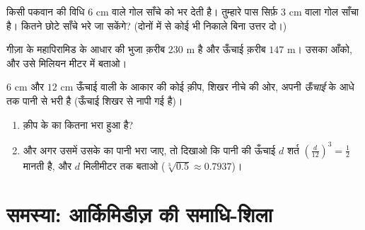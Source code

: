 \begin{exercise}[$\star\star$]\label{exo:g9:solids:7}
किसी पकवान की विधि $6$ cm  वाले गोल साँचे को भर देती है।
तुम्हारे पास सिर्फ़ $3$ cm  वाला गोल साँचा है। कितने छोटे
साँचे भरे जा सकेंगे? (दोनों में से कोई भी  निकाले बिना उत्तर
दो।)
\end{exercise}

\begin{exercise}[$\star\star$]\label{exo:g9:solids:8}
गीज़ा के महापिरामिड के आधार की भुजा क़रीब $230$ m है और ऊँचाई क़रीब
$147$ m। उसका  आँको, और उसे मिलियन  मीटर में बताओ।
\end{exercise}

\begin{exercise}[$\star\star\star$]\label{exo:g9:solids:9}
$6$ cm  और $12$ cm ऊँचाई वाली  के आकार की कोई क़ीप, शिखर
नीचे की ओर, अपनी \emph{ऊँचाई} के आधे तक पानी से भरी है (ऊँचाई शिखर
से नापी गई है)।
\begin{enumerate}
  \item क़ीप के  का कितना  भरा हुआ है?
  \item और अगर उसमें उसके \emph{} का  पानी भरा जाए, तो
        दिखाओ कि पानी की ऊँचाई $d$ शर्त
        $\left(\frac{d}{12}\right)^3 = \frac12$ मानती है, और $d$
        मिलीमीटर तक बताओ ($\sqrt[3]{0.5} \approx 0.7937$)।
\end{enumerate}
\end{exercise}

\section{समस्या: आर्किमिडीज़ की समाधि-शिला}

